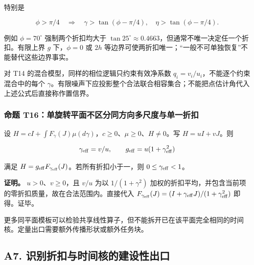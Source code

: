 \documentclass[11pt,a4paper]{article}
\begin{document}
\par
\noindent\begin{minipage}{\linewidth}

特别是

\[
\boxed{\phi>\pi/4\quad\Longrightarrow\quad
\gamma>\tan(\phi-\pi/4),\quad
\eta>\tan(\phi-\pi/4).}
\]

\end{minipage}\par

例如 \(\phi=70^\circ\) 强制两个折扣均大于
\(\tan25^\circ\approx0.4663\)，但通常不唯一决定任一个折扣。有限上界
\(g\) 下，\(\phi=0\) 或 \(2h\)
等边界可使两折扣唯一；“一般不可单独恢复”不能替代这些边界事实。

对 T14 的混合模型，同样的相位逻辑只约束有效净系数
\(q_i=v_i/u_i\)，不能逐个约束混合中的每个
\(\gamma\)。有限噪声下应投影整个合法联合相容集合；不能把点估计角代入上述公式后直接称作置信界。

\subsubsection{命题
T16：单旋转平面不区分同方向多尺度与单一折扣}\label{ux547dux9898-t16ux5355ux65cbux8f6cux5e73ux9762ux4e0dux533aux5206ux540cux65b9ux5411ux591aux5c3aux5ea6ux4e0eux5355ux4e00ux6298ux6263}

\par
\noindent\begin{minipage}{\linewidth}

设
\(H=cI+\int F_\gamma(J)\mu(d\gamma)\)，\(c\ge0\)、\(\mu\ge0\)、\(H\ne0\)。写
\(H=uI+vJ\)。则

\[
\gamma_{\rm eff}=v/u,\qquad
g_{\rm eff}=u(1+\gamma_{\rm eff}^2)
\]

\end{minipage}\par

满足 \(H=g_{\rm eff}F_{\gamma_{\rm eff}}(J)\)。若所有折扣小于一，则
\(0\le\gamma_{\rm eff}<1\)。

\textbf{证明。} \(u>0\)、\(v\ge0\)，且 \(v/u\) 为以 \(1/(1+\gamma^2)\)
加权的折扣平均，并包含当前项的零折扣质量，故在合法范围内。直接代入
\(F_{\gamma_{\rm eff}}(J)=(I+\gamma_{\rm eff}J)/(1+\gamma_{\rm eff}^2)\)
即得。证毕。

更多同平面模板可以检验共享线性算子，但不能拆开已在该平面完全相同的时间核。定量出口需要额外传播形状或额外任务块。

\subsection{A7.
识别折扣与时间核的建设性出口}\label{a7.-ux8bc6ux522bux6298ux6263ux4e0eux65f6ux95f4ux6838ux7684ux5efaux8bbeux6027ux51faux53e3}
\end{document}
